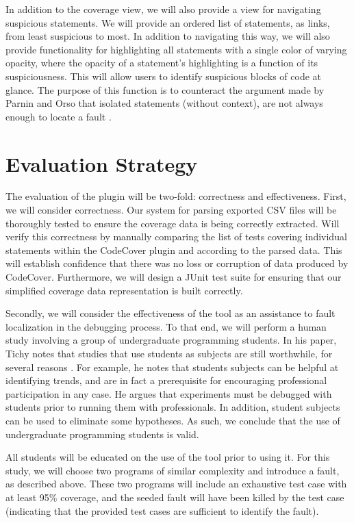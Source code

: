 \documentclass[11pt]{article}
\begin{document}
In addition to the coverage view, we will also provide a view for navigating
suspicious statements.  We will provide an ordered list of statements, as links,
from least suspicious to most.  In addition to navigating this way, we will also
provide functionality for highlighting all statements with a single color of
varying opacity, where the opacity of a statement's highlighting is a function
of its suspiciousness.  This will allow users to identify suspicious blocks of code
at glance.  The purpose of this function is to counteract the argument made by 
Parnin and Orso that isolated statements (without context), are not always enough
to locate a fault \cite{parnin}.

\vspace*{-.2in}
\section{Evaluation Strategy}
\label{sec:evaluate}
\vspace*{-.1in}

The evaluation of the plugin will be two-fold: correctness and effectiveness.
First, we will consider correctness.  Our system for parsing exported CSV
files will be thoroughly tested to ensure the coverage data is being
correctly extracted.  Will verify this correctness by manually comparing
the list of tests covering individual statements within the CodeCover plugin
and according to the parsed data.  This will establish confidence that there
was no loss or corruption of data produced by CodeCover.  Furthermore, we 
will design a JUnit test suite for ensuring that our simplified coverage
data representation is built correctly.

Secondly, we will consider the effectiveness of the tool as an
assistance to fault localization in the debugging process.  To that end,
we will perform a human study involving a group of undergraduate
programming students.  In his paper, Tichy notes that studies that use 
students as subjects are still worthwhile, for several reasons \cite{students}.
For example, he notes that students subjects can be helpful at identifying
trends, and are in fact a prerequisite for encouraging professional 
participation in any case.  He argues that experiments must be debugged with 
students prior to running them with professionals.  In addition, student
subjects can be used to eliminate some hypotheses.  As such, we conclude
that the use of undergraduate programming students is valid.

All students will be educated on the use of the
tool prior to using it.  For this study, we will choose two programs of
similar complexity and introduce a fault, as described above.  These two
programs will include an exhaustive test case with at least 95\%
coverage, and the seeded fault will have been killed by the test case
(indicating that the provided test cases are sufficient to identify the
fault).
\end{document}
